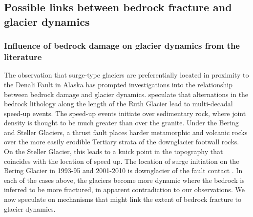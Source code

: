 \documentclass[draft,linenumbers]{agujournal}
\begin{document}
\subsection{Possible links between bedrock fracture and glacier dynamics}

\subsubsection{Influence of bedrock damage on glacier dynamics from the literature}

The observation that surge-type glaciers are preferentially located in proximity to the Denali Fault in Alaska \citep{Post1969} has prompted investigations into the relationship between bedrock damage and glacier dynamics. \cite{Turrin2014} speculate that alternations in the bedrock lithology along the length of the Ruth Glacier lead to multi-decadal speed-up events. The speed-up events initiate over sedimentary rock, where joint density is thought to be much greater than over the granite. Under the Bering and Steller Glaciers, a thrust fault places harder metamorphic and volcanic rocks over the more easily erodible Tertiary strata of the downglacier footwall rocks. On the Steller Glacier, this leads to a knick point in the topography that coincides with the location of speed up. The location of surge initiation on the Bering Glacier in 1993-95 \citep{Fatland2002,Roush2003} and 2001-2010 \citep{Turrin2013} is downglacier of the fault contact \citep{Bruhn2010,Turrin2013}. In each of the cases above, the glaciers become more dynamic where the bedrock is inferred to be more fractured, in apparent contradiction to our observations. We now speculate on mechanisms that might link the extent of bedrock fracture to glacier dynamics. 
\end{document}
